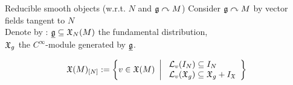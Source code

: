\documentclass[handout,10pt]{beamer}
\renewcommand{\action}{\curvearrowright}
\begin{document}



\begin{frame}{Reducible smooth objects \quad \small (w.r.t. $N$ and $\g\action M$)}
	Consider $\g \action M$ by vector fields tangent to $N$ %
	\\
	\vfill
	Denote by :  
	\hspace{1em} $\underline{\mathfrak{g}}\subseteq \mathfrak{X}_N(M)$ the fundamental distribution,
	\\
	\hspace{6.5em}  $\mathfrak{X}_g$ the $C^\infty$-module generated by $\underline{\mathfrak{g}}$.
	\\
	\vfill
	\begin{defblock}
			\begin{displaymath}
				\mathfrak{X}(M)_{[N]} :=
				\left\lbrace
					v \in \mathfrak{X}(M)
				~\left\vert~
					\begin{array}{l}
						\mathcal{L}_v (I_N) \subseteq I_N	\\		
						\mathcal{L}_v (\mathfrak{X}_g) \subseteq \mathfrak{X}_g + I_{\mathfrak{X}}
					\end{array}
				\right\rbrace\right.
			\end{displaymath}


\end{defblock}
\end{frame}
\end{document}
